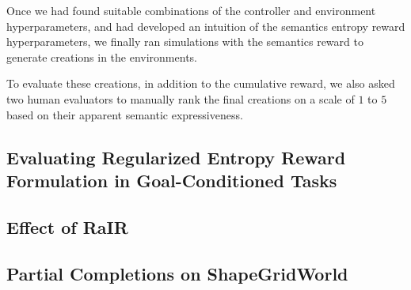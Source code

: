 Once we had found suitable combinations of the controller and environment hyperparameters, and had developed an intuition of the semantics entropy reward hyperparameters, we finally ran simulations with the semantics reward to generate creations in the environments.

To evaluate these creations, in addition to the cumulative reward, we also asked two human evaluators to manually rank the final creations on a scale of \(1\) to \(5\) based on their apparent semantic expressiveness.

\subsection{Evaluating Regularized Entropy Reward Formulation in Goal-Conditioned Tasks}
\label{sec:evaluating-regularized-entropy}


\subsection{Effect of RaIR}
\label{sec:effect-rair}


\subsection{Partial Completions on ShapeGridWorld}
\label{sec:partial-completion}
